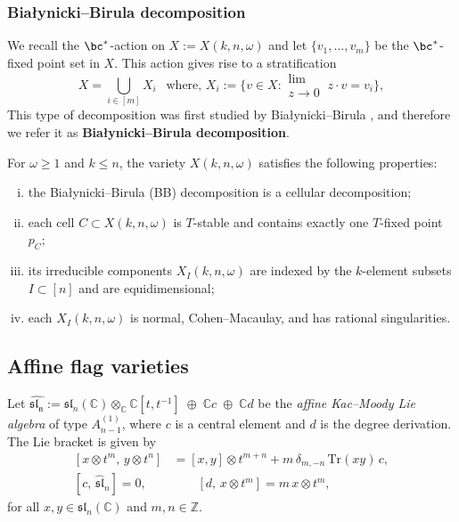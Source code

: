 \documentclass[10pt, a4paper, reqno]{amsart}
\begin{document}
\subsubsection{Bia\l ynicki--Birula decomposition}
We recall the $\bc^*$-action on $X:=X(k,n,\omega)$ and let $\{v_1,\ldots,v_m\}$ be the $\bc^*$-fixed point set in $X$. This  action gives rise to a stratification %
\begin{equation}
X=\bigcup_{i\in [m]}X_i~~\text{ where, } X_i:=\Big\{v\in X:\substack{\mbox{lim}\\{z\to 0}}~z\cdot v=v_i\Big\},
\end{equation}
This type of decomposition was first studied by Bia\l ynicki--Birula \cite{bb}, and therefore we refer it as \textbf{Bia\l ynicki--Birula decomposition}.

\begin{guess}{\cite[Theorem 2.11]{flp24}}
For $\omega \geq 1$ and $k \leq n$, the variety $X(k,n,\omega)$ satisfies the following properties:
\begin{enumerate}[(i)]
	\item the Bia\l ynicki–Birula (BB) decomposition is a cellular decomposition;
	\item each cell $C\subset X(k,n,\omega)$ is $T$-stable and contains exactly one $T$-fixed point $p_C$;
	\item its irreducible components $X_I(k,n,\omega)$ are indexed by the $k$-element subsets $I \subset [n]$ and are equidimensional;
	\item each $X_I(k,n,\omega)$ is normal, Cohen–Macaulay, and has rational singularities. 
\end{enumerate}
\end{guess}




\subsection{Affine flag varieties}\label{ss:afg}


Let $\widehat{\mathfrak{sl_n}}:=\mathfrak{sl}_n(\mathbb{C}) \otimes_{\mathbb{C}} \mathbb{C}[t, t^{-1}]
\;\oplus\; \mathbb{C}c \;\oplus\; \mathbb{C}d$ be the \emph{affine Kac--Moody Lie algebra} of type $A_{n-1}^{(1)}$,  where $c$ is a central element and $d$ is the degree derivation.  	The Lie bracket is given by
\[\begin{split}
	[x \otimes t^m,\, y \otimes t^n] 
&= [x,y] \otimes t^{m+n} 
+ m\, \delta_{m,-n} \, \mathrm{Tr}(xy)\, c,\\
[c,\, \widehat{\mathfrak{sl}}_n] = 0,&
\qquad 
[d,\, x \otimes t^m] = m\, x \otimes t^m,\end{split}
\]
for all $x, y \in \mathfrak{sl}_n(\mathbb{C})$ and $m,n \in \mathbb{Z}$.
\end{document}
